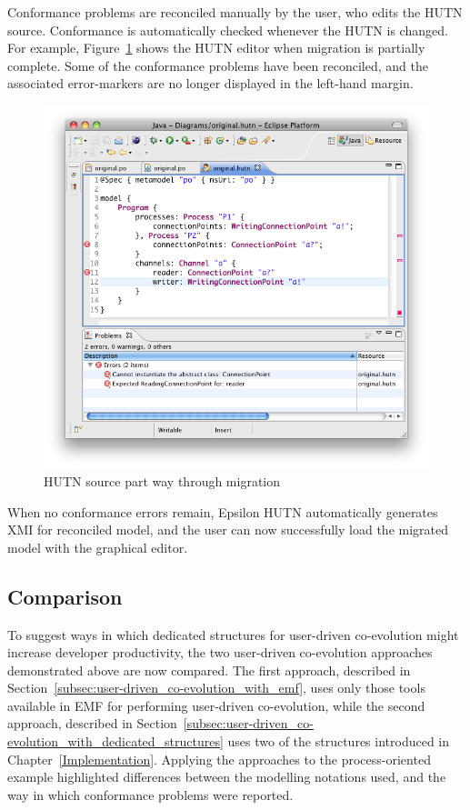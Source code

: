 Conformance problems are reconciled manually by the user, who edits the HUTN source. Conformance is automatically checked whenever the HUTN is changed. For example, Figure~\ref{fig:po_hutn_partial} shows the HUTN editor when migration is partially complete. Some of the conformance problems have been reconciled, and the associated error-markers are no longer displayed in the left-hand margin.

\begin{figure}[htbp]
  \centering
  \includegraphics[width=13.5cm]{6.Evaluation/images/user_driven/po_hutn_partial.png}
  \caption{HUTN source part way through migration}
  \label{fig:po_hutn_partial}
\end{figure}

When no conformance errors remain, Epsilon HUTN automatically generates XMI for reconciled model, and the user can now successfully load the migrated model with the graphical editor.

\subsection{Comparison}
\label{subsec:user_driven_example_comparison}
To suggest ways in which dedicated structures for user-driven co-evolution might increase developer productivity, the two user-driven co-evolution approaches demonstrated above are now compared. The first approach, described in Section~\ref{subsec:user-driven_co-evolution_with_emf}, uses only those tools available in EMF for performing user-driven co-evolution, while the second approach, described in Section~\ref{subsec:user-driven_co-evolution_with_dedicated_structures} uses two of the structures introduced in Chapter~\ref{Implementation}. Applying the approaches to the process-oriented example highlighted differences between the modelling notations used, and the way in which conformance problems were reported.

